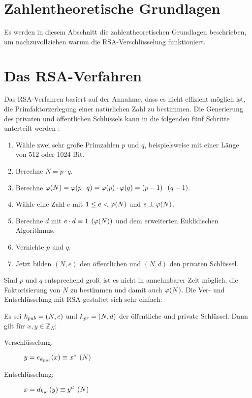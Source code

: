 \section{Zahlentheoretische Grundlagen}
Es werden in diesem Abschnitt die zahlentheoretischen Grundlagen beschrieben,
um nachzuvollziehen warum die RSA-Verschlüsselung funktioniert.







\section{Das RSA-Verfahren}
Das RSA-Verfahren basiert auf der Annahme, dass es nicht effizient
möglich ist, die Primfaktorzerlegung einer natürlichen Zahl zu bestimmen.
Die Generierung des privaten und öffentlichen Schlüssels kann in die
folgenden fünf Schritte unterteilt werden \parencite[176]{BOOK:crypto}:
\newpage

\begin{definition}\mbox{}
  \begin{enumerate}
    \item Wähle zwei sehr große Primzahlen $p$ und $q$, beispielsweise mit einer
          Länge von 512 oder 1024 Bit.
    \item Berechne $N = p \cdot q$.
    \item Berechne $\varphi(N) = \varphi(p \cdot q) = \varphi(p) \cdot \varphi(q) = (p-1) \cdot (q-1)$.
    \item Wähle eine Zahl $e$ mit $1 \leq e < \varphi(N)$ und $e \perp \varphi(N)$.
    \item Berechne $d$ mit $e \cdot d \equiv 1 \pod{\varphi(N)}$ und dem erweiterten
          Euklidischen Algorithmus.
    \item Vernichte $p$ und $q$.
    \item Jetzt bilden $(N,e)$ den öffentlichen und $(N,d)$ den privaten Schlüssel.
  \end{enumerate}
\end{definition}

\noindent
Sind $p$ und $q$ entsprechend groß, ist es nicht in annehmbarer Zeit möglich, die Faktorisierung
von $N$ zu bestimmen und damit auch $\varphi(N)$. Die Ver- und Entschlüsselung mit RSA
gestaltet sich sehr einfach:

\begin{definition}
  Es sei $k_{pub} = (N,e)$ und $k_{pr} = (N,d)$ der öffentliche und private Schlüssel.
  Dann gilt für $x,y \in \mathbb{Z}_N$:
  \begin{description}
    \item[Verschlüsselung:] $y = e_{k_{pub}}(x) \equiv x^e \pod{N}$
    \item[Entschlüsselung:] $x = d_{k_{pr}}(y) \equiv y^d \pod{N}$
  \end{description}
\end{definition}

